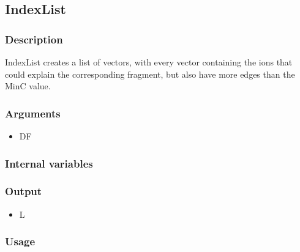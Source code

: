 \subsection{IndexList}
\subsubsection{Description}
IndexList creates a list of vectors, with every vector containing the ions that could explain the corresponding fragment, but also have more edges than the MinC value.
\subsubsection{Arguments}
\begin{itemize}
\item DF
\end{itemize}
\subsubsection{Internal variables}
\subsubsection{Output}
\begin{itemize}
\item L
\end{itemize}
\subsubsection{Usage}


